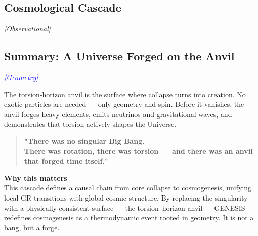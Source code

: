 \documentclass{article}
\newcommand{\geometrytag}{\textcolor{blue}{\textit{[Geometry]}}}
\newcommand{\obstag}{\textcolor{green!60!black}{\textit{[Observational]}}}
\begin{document}
\subsection{Cosmological Cascade}
\label{subsec:THF-cascade}
\obstag

\begin{center}
\end{center}

\subsection{Summary: A Universe Forged on the Anvil}
\label{subsec:THF-summary}
\geometrytag

\noindent The torsion-horizon anvil is the surface where collapse turns into creation.
No exotic particles are needed --- only geometry and spin.
Before it vanishes, the anvil forges heavy elements, emits neutrinos and gravitational waves, and demonstrates that torsion actively shapes the Universe.

\begin{quotation}
\centering
\textbf{"There was no singular Big Bang.  \\ There was rotation, there was torsion --- and there was an anvil that forged time itself."}
\end{quotation}


\begin{tcolorbox}[
  colback=white,
  colframe=black!30,
  boxrule=0.3pt,
  arc=2pt,
  left=6pt,
  right=6pt,
  top=4pt,
  bottom=4pt,
  enhanced
]
\textbf{Why this matters} \\
\vspace{2pt}
This cascade defines a causal chain from core collapse to cosmogenesis, unifying local GR transitions with global cosmic structure. By replacing the singularity with a physically consistent surface — the torsion–horizon anvil — GENESIS redefines cosmogenesis as a thermodynamic event rooted in geometry. It is not a bang, but a forge.
\end{tcolorbox}


\end{document}
